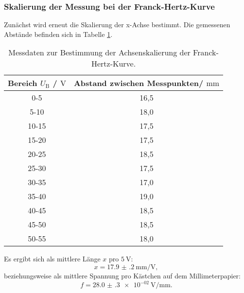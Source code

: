 \subsubsection{Skalierung der Messung bei der Franck-Hertz-Kurve}
Zunächst wird erneut die Skalierung der x-Achse bestimmt.
Die gemessenen Abstände befinden sich in Tabelle \ref{tab:franckie}.
\begin{table}
	\centering
	\caption{Messdaten zur Bestimmung der Achsenskalierung der Franck-Hertz-Kurve.}
	\label{tab:franckie}
	\begin{tabular}{cc}
		\toprule
		Bereich $U_{\mathrm{B}}$ / $\si{\volt}$ & Abstand zwischen Messpunkten/ $\si{\milli\meter}$ \\
		\midrule
		0-5 & 16,5 \\
		5-10 & 18,0 \\
		10-15 & 17,5 \\
		15-20 & 17,5 \\
		20-25 & 18,5 \\
		25-30 & 17,5 \\
		30-35 & 17,0 \\
		35-40 & 19,0 \\
		40-45 & 18,5 \\
		45-50 & 18,5 \\
		50-55 & 18,0 \\
		\bottomrule
	\end{tabular}
\end{table}
Es ergibt sich als mittlere Länge $x$ pro $\SI{5}{\volt}$:
\begin{equation}
	x=\SI{17.9(2)}{\milli\meter\per\volt} \mathrm{,}
\end{equation}
beziehungsweise als mittlere Spannung pro Kästchen auf dem Millimeterpapier:
\begin{equation}
	f= \SI{28.0(3)e-02}{\volt\per\milli\meter} \mathrm{.}
\end{equation}
\FloatBarrier
